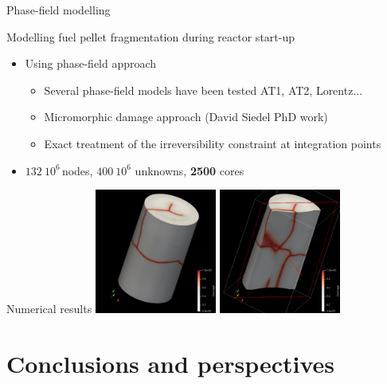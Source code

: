 \documentclass{beamer}
\begin{document}
\begin{frame}{Phase-field modelling}
  \begin{block}{Modelling fuel pellet fragmentation during reactor start-up}
    \begin{itemize}
      \item Using phase-field approach
      \begin{itemize}
      \item Several phase-field models have been tested AT1, AT2, Lorentz...
      \item Micromorphic damage approach (David Siedel PhD work)
      \item Exact treatment of the irreversibility constraint at integration points
      \end{itemize}
      \item $132\ 10^6$\,nodes, $400\ 10^6$ unknowns, \textbf{2500} cores 
    \end{itemize}
  \end{block}
  \begin{block}{Numerical results}
    \hspace*{1cm}\includegraphics[width=0.3\textwidth]{graphics/damag1.png}
    \hspace*{2cm}\includegraphics[width=0.3\textwidth]{graphics/damag2.png}
  \end{block}
\end{frame}


\section{Conclusions and perspectives}
\end{document}

